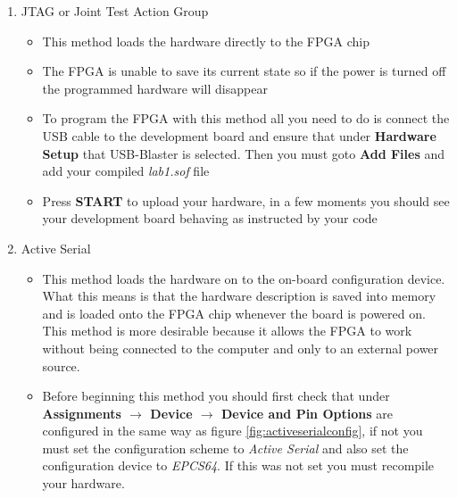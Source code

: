 \begin{enumerate}

	\item JTAG or Joint Test Action Group

	\begin{itemize}
	
		\item This method loads the hardware directly to the FPGA chip
		
		\item The FPGA is unable to save its current state so if the power is turned off the programmed hardware will disappear
		
		\item To program the FPGA with this method all you need to do is connect the USB cable to the development board and ensure that under {\bf Hardware Setup} that USB-Blaster is selected. Then you must goto {\bf Add Files} and add your compiled \emph{lab1.sof} file
		
		\item Press {\bf START} to upload your hardware, in a few moments you should see your development board behaving as instructed by your code
		
	\end{itemize}

\item Active Serial

	\begin{itemize}
		\item This method loads the hardware on to the on-board configuration device. What this means is that the hardware description is saved into memory and is loaded onto the FPGA chip whenever the board is powered on. This method is more desirable because it allows the FPGA to work without being connected to the computer and only to an external power source.
		
		\item Before beginning this method you should first check that under {\bf Assignments $\rightarrow$ Device $\rightarrow$ Device and Pin Options} are configured in the same way as figure \ref{fig:activeserialconfig}, if not you must set the configuration scheme to \emph{Active Serial} and also set  the configuration device to \emph{EPCS64}. If this was not set you must recompile your hardware.


\end{itemize}
\end{enumerate}
